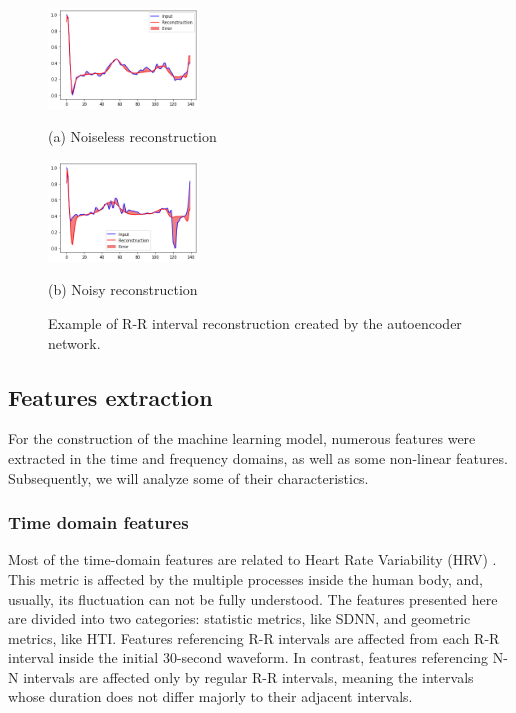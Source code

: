 \begin{figure}[htb]

\begin{minipage}[b]{.48\linewidth}
  \centering
  \centerline{\includegraphics[width=4.0cm]{autoenc_good.png}}
  \centerline{(a) Noiseless reconstruction}\medskip
\end{minipage}
\hfill
\begin{minipage}[b]{0.48\linewidth}
  \centering
  \centerline{\includegraphics[width=4.0cm]{autoenc_bad.png}}
  \centerline{(b) Noisy reconstruction}\medskip
\end{minipage}
%
\caption{Example of R-R interval reconstruction created by the autoencoder network.}
\label{fig:res}
%
\end{figure}


\subsection{Features extraction}
\label{ssec:features_extraction}

For the construction of the machine learning model, numerous features were extracted in the time and frequency domains, as well as some non-linear features. Subsequently, we will analyze some of their characteristics.
 
\subsubsection{Time domain features}
\label{sssec:time_domain_features}

Most of the time-domain features are related to Heart Rate Variability (HRV) \cite{hrv_overview}. This metric is affected by the multiple processes inside the human body, and, usually, its fluctuation can not be fully understood. The features presented here are divided into two categories: statistic metrics, like SDNN, and geometric metrics, like HTI. Features referencing R-R intervals are affected from each R-R interval inside the initial 30-second waveform. In contrast, features referencing N-N intervals are affected only by regular R-R intervals, meaning the intervals whose duration does not differ majorly to their adjacent intervals.

